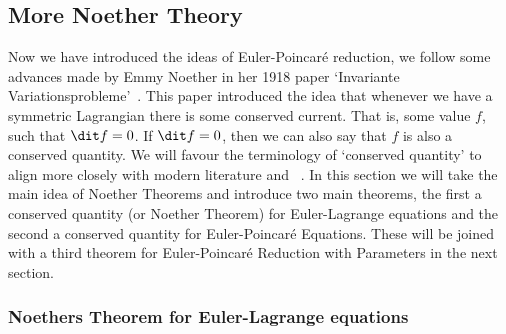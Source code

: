 
\subsection{More Noether Theory}
Now we have introduced the ideas of Euler-Poincar\'e reduction, we follow some advances made by Emmy Noether in her 1918 paper `Invariante Variationsprobleme'~\cite{Noether1918}. This paper introduced the idea that whenever we have a symmetric Lagrangian there is some conserved current. That is, some value $f$, such that $\dit f = 0$. If $\dit f = 0$, then we can also say that $f$ is also a conserved quantity. We will favour the terminology of `conserved quantity' to align more closely with modern literature and ~\cite{holm_schmah_stoica_2009}. In this section we will take the main idea of Noether Theorems and introduce two main theorems, the first a conserved quantity (or Noether Theorem) for Euler-Lagrange equations and the second a conserved quantity for Euler-Poincar\'e Equations. These will be joined with a third theorem for Euler-Poincar\'e Reduction with Parameters in the next section.
\subsubsection{Noethers Theorem for Euler-Lagrange equations}


